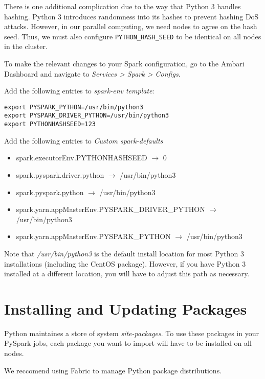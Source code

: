 \documentclass[9pt,twocolumn,twoside]{idsi}
\begin{document}
There is one additional complication due to the way that Python 3 handles hashing. Python 3 introduces randomness into its hashes to prevent hashing DoS attacks. However, in our parallel computing, we need nodes to agree on the hash seed. Thus, we must also configure \texttt{PYTHON\_HASH\_SEED} to be identical on all nodes in the cluster.

To make the relevant changes to your Spark configuration, go to the Ambari Dashboard and navigate to \emph{Services > Spark > Configs}.

Add the following entries to \emph{spark-env template}:

\begin{lstlisting}
export PYSPARK_PYTHON=/usr/bin/python3
export PYSPARK_DRIVER_PYTHON=/usr/bin/python3
export PYTHONHASHSEED=123
\end{lstlisting}

Add the following entries to \emph{Custom spark-defaults}
\begin{itemize}
  \item spark.executorEnv.PYTHONHASHSEED $\rightarrow$ 0

  \item spark.pyspark.driver.python $\rightarrow$ /usr/bin/python3

  \item spark.pyspark.python $\rightarrow$ /usr/bin/python3

  \item spark.yarn.appMasterEnv.PYSPARK\_DRIVER\_PYTHON $\rightarrow$ /usr/bin/python3

  \item spark.yarn.appMasterEnv.PYSPARK\_PYTHON $\rightarrow$ /usr/bin/python3
\end{itemize}

Note that \emph{/usr/bin/python3} is the default install location for most Python 3 installations (including the CentOS package). However, if you have Python 3 installed at a different location, you will have to adjust this path as necessary.

\section{Installing and Updating Packages}

Python maintaines a store of system \emph{site-packages}. To use these packages in your PySpark jobs, each package you want to import will have to be installed on all nodes.

We reccomend using Fabric to manage Python package distributions.
\end{document}
